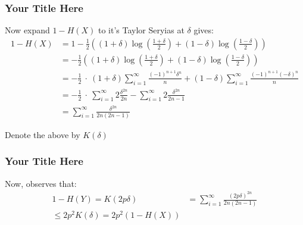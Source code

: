 \documentclass{beamer}
\begin{document}
\begin{frame}
  \frametitle{Your Title Here}
Now expand $ 1 - H(X)$ to it's Taylor Seryias at $\delta$ gives: 
\begin{equation*}
  \begin{split}
  1 - H(X) &= 1 - \frac{1}{2} \left( \left( 1 + \delta \right) \log       \left( \frac{1 + \delta}{2} \right) + \left( 1 - \delta \right) \log       \left( \frac{1 - \delta}{2} \right) \right) \\ 
  &=- \frac{1}{2} \left( \left( 1 + \delta \right) \log       \left( \frac{1 + \delta}{2} \right) + \left( 1 - \delta \right) \log       \left( \frac{1 - \delta}{2} \right) \right) \\ 
  &= - \frac{1}{2} \ \cdot \  (1+ \delta) \sum_{i=1}^{\infty}{ \frac{(-1)^{n+1}\delta^{n}}{n} } +  (1- \delta) \sum_{i=1}^{\infty}{ \frac{(-1)^{n+1}(-\delta)^{n}}{n} }\\
&=  - \frac{1}{2} \ \cdot \   \sum_{i=1}^{\infty}{2 \frac{\delta^{2n}}{2n} }  - \sum_{i=1}^{\infty}{ 2\frac{\delta^{2n}}{2n-1} }\\ 
      &= \sum_{ i =1 }^{\infty} \frac{\delta^{2n} }{ 2n(2n-1)  } 
  \end{split}
\end{equation*}

Denote the above by $K(\delta)$

\end{frame}


\begin{frame}
  \frametitle{Your Title Here}
  Now, observes that: 
  \begin{equation*}
    \begin{split}
      1 - H(Y) = K(2p \delta) &= \sum_{ i =1 }^{\infty} \frac{(2 p\delta)^{2n} }{ 2n(2n-1)  }\\
      \le 2p^{2}K(\delta) = 2p^{2}( 1 - H(X) )
    \end{split}
  \end{equation*}
\end{frame}  
\end{document}
